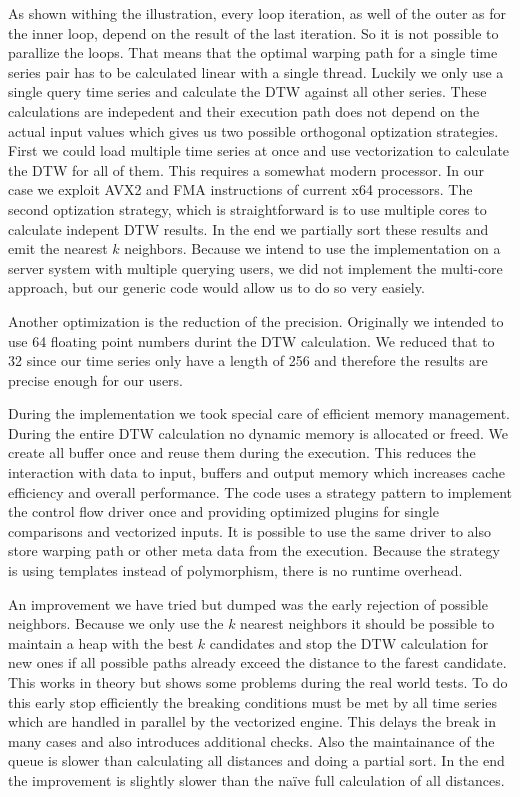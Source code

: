 As shown withing the illustration, every loop iteration, as well of the outer as for the inner loop, depend on the result of the last iteration. So it is not possible to parallize the loops. That means that the optimal warping path for a single time series pair has to be calculated linear with a single thread. Luckily we only use a single query time series and calculate the DTW against all other series. These calculations are indepedent and their execution path does not depend on the actual input values which gives us two possible orthogonal optization strategies. First we could load multiple time series at once and use vectorization to calculate the DTW for all of them. This requires a somewhat modern processor. In our case we exploit AVX2 and FMA instructions of current x64 processors. The second optization strategy, which is straightforward is to use multiple cores to calculate indepent DTW results. In the end we partially sort these results and emit the nearest $k$ neighbors. Because we intend to use the implementation on a server system with multiple querying users, we did not implement the multi-core approach, but our generic code would allow us to do so very easiely.

Another optimization is the reduction of the precision. Originally we intended to use \SI{64}{\bit} floating point numbers durint the DTW calculation. We reduced that to \SI{32}{\bit} since our time series only have a length of \num{256} and therefore the results are precise enough for our users.

During the implementation we took special care of efficient memory management. During the entire DTW calculation no dynamic memory is allocated or freed. We create all buffer once and reuse them during the execution. This reduces the interaction with data to input, buffers and output memory which increases cache efficiency and overall performance. The code uses a strategy pattern to implement the control flow driver once and providing optimized plugins for single comparisons and vectorized inputs. It is possible to use the same driver to also store warping path or other meta data from the execution. Because the strategy is using templates instead of polymorphism, there is no runtime overhead.

An improvement we have tried but dumped was the early rejection of possible neighbors. Because we only use the $k$ nearest neighbors it should be possible to maintain a heap with the best $k$ candidates and stop the DTW calculation for new ones if all possible paths already exceed the distance to the farest candidate. This works in theory but shows some problems during the real world tests. To do this early stop efficiently the breaking conditions must be met by all time series which are handled in parallel by the vectorized engine. This delays the break in many cases and also introduces additional checks. Also the maintainance of the queue is slower than calculating all distances and doing a partial sort. In the end the improvement is slightly slower than the na{\"i}ve full calculation of all distances.



